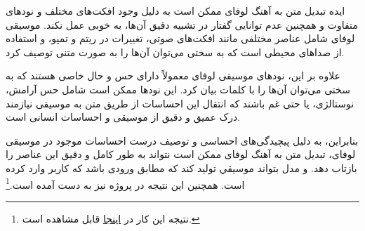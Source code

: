 ایده تبدیل متن به آهنگ لوفای  ممکن است به دلیل وجود افکت‌های مختلف و نودهای متفاوت و همچنین عدم توانایی گفتار در تشبیه دقیق آن‌ها، به خوبی عمل نکند. موسیقی لوفای شامل عناصر مختلفی مانند افکت‌های صوتی، تغییرات در ریتم و تمپو، و استفاده از صداهای محیطی است که به سختی می‌توان آن‌ها را به صورت متنی توصیف کرد.

علاوه بر این، نودهای موسیقی لوفای معمولاً دارای حس و حال خاصی هستند که به سختی می‌توان آن‌ها را با کلمات بیان کرد. این نودها ممکن است شامل حس آرامش، نوستالژی، یا حتی غم باشند که انتقال این احساسات از طریق متن به موسیقی نیازمند درک عمیق و دقیق از موسیقی و احساسات انسانی است.

بنابراین، به دلیل پیچیدگی‌های احساسی و توصیف درست احساسات موجود در موسیقی لوفای، تبدیل متن به آهنگ لوفای ممکن است نتواند به طور کامل و دقیق این عناصر را بازتاب دهد. و مدل بتواند موسیقي تولید کند که مطابق ورودی باشد که کاربر وارد کرده است. همچنین این نتیجه در پروژه  \cite{Zhang} نیز به دست آمده است.\footnote{نتیجه این کار در \href{https://github.com/jacbz/Lofi/tree/main/model\#lyrics2lofi}{اینجا} قابل مشاهده است.}
